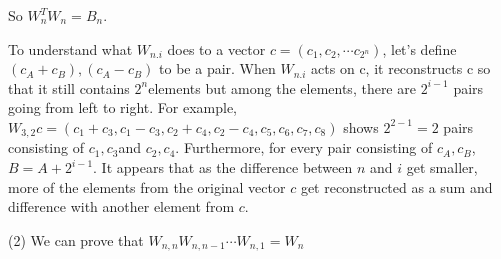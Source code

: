 \documentclass[12pt]{article}
\begin{document}
So $W_n^TW_n = B_n$.




\medskip
To understand what $W_{n.i}$ does to a vector $c=(c_{1},c_{2},\cdots c_{2^{n}})$,
let's define $(c_{A}+c_{B}),(c_{A}-c_{B})$ to be a pair. When $W_{n.i}$
acts on c, it reconstructs c so that it still contains $2^{n}$elements
but among the elements, there are $2^{i-1}$ pairs going from left
to right. For example, $W_{3,2}c=(c_{1}+c_{3},c_{1}-c_{3},c_{2}+c_{4},c_{2}-c_{4},c_{5},c_{6},c_{7},c_{8})$
shows $2^{2-1}=2$ pairs consisting of $c_{1},c_{3}$and $c_{2},c_{4}.$
Furthermore, for every pair consisting of $c_{A},c_{B}$, $B=A+2^{i-1}$.
It appears that as the difference between $n$ and $i$ get smaller,
more of the elements from the original vector $c$ get reconstructed
as a sum and difference with another element from $c$. 

(2) We can prove that $W_{n,n}W_{n,n-1}\cdots W_{n,1}=W_{n}$
\end{document}
